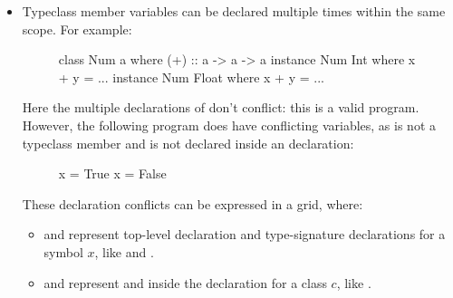 \documentclass[dissertation.tex]{subfiles}
\begin{document}
{{{            \begin{itemize}
            \item
            {

                Typeclass member variables can be declared multiple times within the same scope. For example:
                
                \begin{figure}[h]
                \begin{haskellfigure}
                class Num a where
                    (+) :: a -> a -> a
                instance Num Int where
                    x + y = ...
                instance Num Float where
                    x + y = ...
                \end{haskellfigure}
                \caption{}
                \label{code:valid-variable-reuse}
                \end{figure}

                Here the multiple declarations of \haskell{+} don't conflict: this is a valid program. However, the
                following program does have conflicting variables, as  is not a typeclass member and is not
                declared inside an  declaration:

                \begin{figure}[h]
                \begin{haskellfigure}
                x = True
                x = False
                \end{haskellfigure}
                \caption{}
                \label{code:invalid-variable-reuse}
                \end{figure}

                These declaration conflicts can be expressed in a grid, where:

                \begin{itemize}
                \item
                {
                    
                     and  represent top-level declaration and
                    type-signature declarations for a symbol \(x\), like  and .

                }
                \item
                {
                    
                     and  represent
                     and  inside the declaration for a class \(c\),
                    like .

}
\end{itemize}}
\end{itemize}}}}
\end{document}
